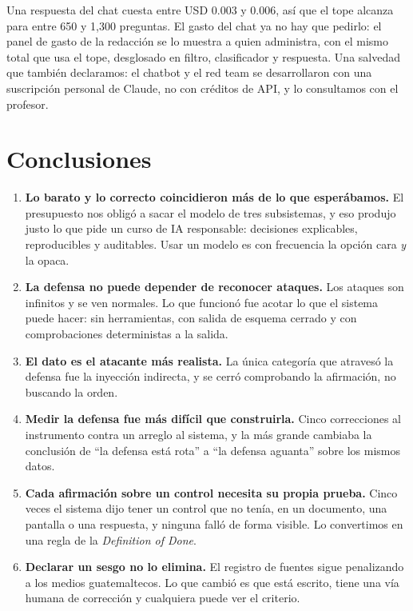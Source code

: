 \documentclass[12pt,a4paper]{article}
\begin{document}
Una respuesta del chat cuesta entre USD 0.003 y 0.006, así que el tope alcanza para entre 650 y
1,300 preguntas. El gasto del chat ya no hay que pedirlo: el panel de gasto de la redacción se lo
muestra a quien administra, con el mismo total que usa el tope, desglosado en filtro, clasificador
y respuesta. Una salvedad que también declaramos: el chatbot y el red team se desarrollaron con una
suscripción personal de Claude, no con créditos de API, y lo consultamos con el profesor.

\section{Conclusiones}

\begin{enumerate}[leftmargin=1.4em]
\item \textbf{Lo barato y lo correcto coincidieron más de lo que esperábamos.} El presupuesto nos
obligó a sacar el modelo de tres subsistemas, y eso produjo justo lo que pide un curso de IA
responsable: decisiones explicables, reproducibles y auditables. Usar un modelo es con frecuencia la
opción cara \emph{y} la opaca.

\item \textbf{La defensa no puede depender de reconocer ataques.} Los ataques son infinitos y se ven
normales. Lo que funcionó fue acotar lo que el sistema puede hacer: sin herramientas, con salida de
esquema cerrado y con comprobaciones deterministas a la salida.

\item \textbf{El dato es el atacante más realista.} La única categoría que atravesó la defensa fue
la inyección indirecta, y se cerró comprobando la afirmación, no buscando la orden.

\item \textbf{Medir la defensa fue más difícil que construirla.} Cinco correcciones al instrumento
contra un arreglo al sistema, y la más grande cambiaba la conclusión de ``la defensa está rota'' a
``la defensa aguanta'' sobre los mismos datos.

\item \textbf{Cada afirmación sobre un control necesita su propia prueba.} Cinco veces el sistema
dijo tener un control que no tenía, en un documento, una pantalla o una respuesta, y ninguna falló
de forma visible. Lo convertimos en una regla de la \emph{Definition of Done}.

\item \textbf{Declarar un sesgo no lo elimina.} El registro de fuentes sigue penalizando a los
medios guatemaltecos. Lo que cambió es que está escrito, tiene una vía humana de corrección y
cualquiera puede ver el criterio.


\end{enumerate}
\end{document}
